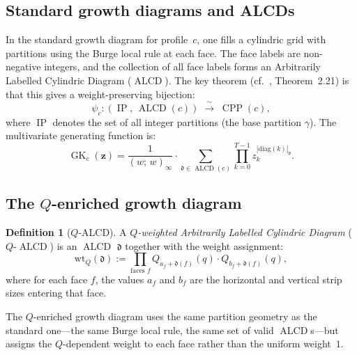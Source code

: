 \documentclass[11pt]{article}
\newcommand{\GK}{\operatorname{GK}}
\newcommand{\CPP}{\operatorname{CPP}}
\newcommand{\ALCD}{\operatorname{ALCD}}
\newcommand{\IP}{\operatorname{IP}}
\theoremstyle{plain}
\theoremstyle{definition}
\newtheorem{definition}[theorem]{Definition}
\begin{document}
\subsection{Standard growth diagrams and ALCDs}

In the standard growth diagram for profile~$c$, one fills a
cylindric grid with partitions using the Burge local rule at each
face.  The face labels are non-negative integers, and the
collection of all face labels forms an Arbitrarily Labelled
Cylindric Diagram ($\ALCD$).  The key theorem
(cf.~\cite{UNDERLYING_SET}, Theorem~2.21) is that this gives a
weight-preserving bijection:
\begin{equation}\label{eq:bijection-std}
  \psi_c \colon (\IP,\, \ALCD(c))
  \;\xrightarrow{\;\sim\;}\;
  \CPP(c),
\end{equation}
where $\IP$ denotes the set of all integer partitions (the base
partition $\gamma$).  The multivariate generating function is:
\begin{equation}\label{eq:GK-std}
  \GK_c(\mathbf{z})
  = \frac{1}{(w;\,w)_\infty} \cdot
    \sum_{\mathfrak{d} \in \ALCD(c)}
    \prod_{k=0}^{T-1} z_k^{|\mathrm{diag}(k)|_\mathfrak{d}}.
\end{equation}

\subsection{The $Q$-enriched growth diagram}

\begin{definition}[$Q$-ALCD]
\label{def:Q-ALCD}
A \emph{$Q$-weighted Arbitrarily Labelled Cylindric Diagram}
($Q$-$\ALCD$) is an $\ALCD$ $\mathfrak{d}$ together with the
weight assignment:
\begin{equation}\label{eq:Q-ALCD-weight}
  \mathrm{wt}_Q(\mathfrak{d})
  := \prod_{\text{faces } f}
     Q_{a_f + \mathfrak{d}(f)}(q) \cdot Q_{b_f + \mathfrak{d}(f)}(q),
\end{equation}
where for each face $f$, the values $a_f$ and $b_f$ are the
horizontal and vertical strip sizes entering that face.
\end{definition}

The $Q$-enriched growth diagram uses the same partition geometry as
the standard one---the same Burge local rule, the same set of
valid $\ALCD$s---but assigns the $Q$-dependent weight to each
face rather than the uniform weight~$1$.
\end{document}
